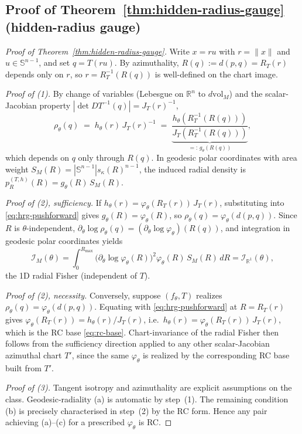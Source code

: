 \documentclass{article}
\theoremstyle{definition}
\theoremstyle{remark}
\newcommand{\vol}{\mathrm{vol}}
\newcommand{\SSS}{\mathbb{S}}
\begin{document}
\subsection{Proof of Theorem~\ref{thm:hidden-radius-gauge} (hidden-radius gauge)}
\label{app:proof_impossibility}

\begin{proof}[Proof of Theorem~\ref{thm:hidden-radius-gauge}]
Write $x=ru$ with $r=\|x\|$ and $u\in\SSS^{n-1}$, and set $q=T(ru)$. By azimuthality,
$R(q):=d(p,q)=R_T(r)$ depends only on $r$, so $r=R_T^{-1}(R(q))$ is well-defined on the chart image.

\emph{Proof of (1).} By change of variables (Lebesgue on $\mathbb{R}^n$ to $d\vol_M$) and the
scalar-Jacobian property $|\det DT^{-1}(q)|=J_T(r)^{-1}$,
\begin{equation}
\rho_\theta(q)\;=\;h_\theta(r)\,J_T(r)^{-1}
\;=\;\underbrace{\frac{h_\theta(R_T^{-1}(R(q)))}{J_T(R_T^{-1}(R(q)))}}_{=:\,g_\theta(R(q))},
\label{eq:hrg-pushforward}
\end{equation}
which depends on $q$ only through $R(q)$. In geodesic polar coordinates with area weight
$S_M(R)=|\SSS^{n-1}|s_\kappa(R)^{n-1}$, the induced radial density is
$p_R^{(T,h)}(R)=g_\theta(R)\,S_M(R)$.

\emph{Proof of (2), sufficiency.} If $h_\theta(r)=\varphi_\theta(R_T(r))\,J_T(r)$, substituting into
\eqref{eq:hrg-pushforward} gives $g_\theta(R)=\varphi_\theta(R)$, so
$\rho_\theta(q)=\varphi_\theta(d(p,q))$. Since $R$ is $\theta$-independent,
$\partial_\theta \log\rho_\theta(q)=(\partial_\theta\log\varphi_\theta)(R(q))$, and integration in
geodesic polar coordinates yields
\[
\mathcal{I}_M(\theta)=\int_0^{R_{\max}}\!\bigl(\partial_\theta\log\varphi_\theta(R)\bigr)^2
\varphi_\theta(R)\,S_M(R)\,dR=\mathcal{I}_{\mathbb{R}^1}(\theta),
\]
the 1D radial Fisher (independent of $T$).

\emph{Proof of (2), necessity.} Conversely, suppose $(f_\theta,T)$ realizes
$\rho_\theta(q)=\varphi_\theta(d(p,q))$. Equating with \eqref{eq:hrg-pushforward} at $R=R_T(r)$ gives
$\varphi_\theta(R_T(r))=h_\theta(r)/J_T(r)$, i.e.\ $h_\theta(r)=\varphi_\theta(R_T(r))\,J_T(r)$, which
is the RC base \eqref{eq:rc-base}. Chart-invariance of the radial Fisher then follows from the
sufficiency direction applied to any other scalar-Jacobian azimuthal chart $T'$, since the same
$\varphi_\theta$ is realized by the corresponding RC base built from $T'$.

\emph{Proof of (3).} Tangent isotropy and azimuthality are explicit assumptions on the class.
Geodesic-radiality (a) is automatic by step~(1). The remaining condition (b) is precisely
characterised in step~(2) by the RC form. Hence any pair achieving (a)--(c) for a prescribed
$\varphi_\theta$ is RC.


\end{proof}
\end{document}
